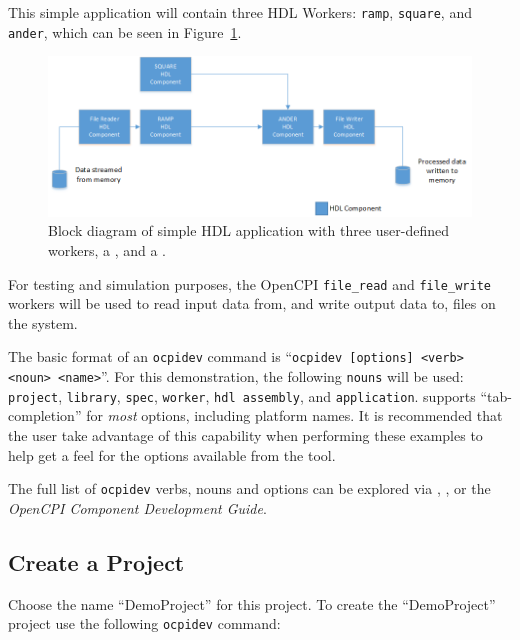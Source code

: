 This simple application will contain three HDL Workers: \verb+ramp+, \verb+square+, and \verb+ander+, which can be seen in Figure~\ref{fig:simple_app_diagram}. \newline

\begin{figure}[h]
        \centering
        \includegraphics[scale=0.5]{./figures/simple_app_block_diagram.png}
        \caption{Block diagram of simple HDL application with three user-defined workers, a , and a .}
        \label{fig:simple_app_diagram}
\end{figure}
For testing and simulation purposes, the OpenCPI \verb+file_read+ and \verb+file_write+ workers will be used to read input data from, and write output data to, files on the system.\newline

The basic format of an \verb+ocpidev+ command is ``\verb+ocpidev [options] <verb> <noun> <name>+''.
For this demonstration, the following \verb+nouns+ will be used: \verb+project+, \verb+library+, \verb+spec+, \verb+worker+, \verb+hdl assembly+, and \verb+application+.
 supports ``tab-completion'' for \textit{most} options, including platform names.
It is recommended that the user take advantage of this capability when performing these examples to help get a feel for the options available from the tool.
\newline

The full list of \verb+ocpidev+ verbs, nouns and options can be explored via , , or the \textit{OpenCPI Component Development Guide}.

\subsection{Create a Project}
Choose the name ``DemoProject'' for this project. To create the ``DemoProject'' project use the following \verb+ocpidev+ command:\\

